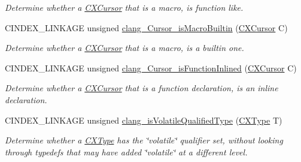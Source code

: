 \begin{DoxyCompactItemize}
\begin{DoxyCompactList}\small\item\em Determine whether a \mbox{\hyperlink{structCXCursor}{C\+X\+Cursor}} that is a macro, is function like. \end{DoxyCompactList}\item 
\mbox{\label{group__CINDEX__TYPES_gad5ddc0fd032716a88cddc14558e0d914}} 
C\+I\+N\+D\+E\+X\+\_\+\+L\+I\+N\+K\+A\+GE unsigned \mbox{\hyperlink{group__CINDEX__TYPES_gad5ddc0fd032716a88cddc14558e0d914}{clang\+\_\+\+Cursor\+\_\+is\+Macro\+Builtin}} (\mbox{\hyperlink{structCXCursor}{C\+X\+Cursor}} C)
\begin{DoxyCompactList}\small\item\em Determine whether a \mbox{\hyperlink{structCXCursor}{C\+X\+Cursor}} that is a macro, is a builtin one. \end{DoxyCompactList}\item 
\mbox{\label{group__CINDEX__TYPES_ga963097b9aecabf5dce7554dff18b061d}} 
C\+I\+N\+D\+E\+X\+\_\+\+L\+I\+N\+K\+A\+GE unsigned \mbox{\hyperlink{group__CINDEX__TYPES_ga963097b9aecabf5dce7554dff18b061d}{clang\+\_\+\+Cursor\+\_\+is\+Function\+Inlined}} (\mbox{\hyperlink{structCXCursor}{C\+X\+Cursor}} C)
\begin{DoxyCompactList}\small\item\em Determine whether a \mbox{\hyperlink{structCXCursor}{C\+X\+Cursor}} that is a function declaration, is an inline declaration. \end{DoxyCompactList}\item 
\mbox{\label{group__CINDEX__TYPES_gaac0ac93cded7d1e5c60f539daaed13ec}} 
C\+I\+N\+D\+E\+X\+\_\+\+L\+I\+N\+K\+A\+GE unsigned \mbox{\hyperlink{group__CINDEX__TYPES_gaac0ac93cded7d1e5c60f539daaed13ec}{clang\+\_\+is\+Volatile\+Qualified\+Type}} (\mbox{\hyperlink{structCXType}{C\+X\+Type}} T)
\begin{DoxyCompactList}\small\item\em Determine whether a \mbox{\hyperlink{structCXType}{C\+X\+Type}} has the \char`\"{}volatile\char`\"{} qualifier set, without looking through typedefs that may have added \char`\"{}volatile\char`\"{} at a different level. \end{DoxyCompactList}\item 
\mbox{\label{group__CINDEX__TYPES_ga12375c30c12b0c3ede87492605db1d0c}} 

\end{DoxyCompactItemize}
